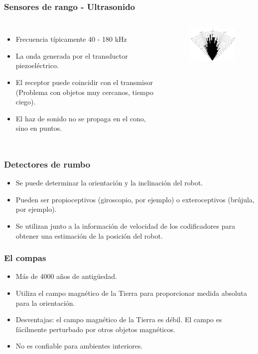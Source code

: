\documentclass{beamer}
\begin{document}
\begin{frame}
\frametitle{Sensores de rango - Ultrasonido}
\begin{columns}[c]
\begin{itemize}
\item Frecuencia típicamente 40 - 180 kHz
\item La onda generada por el transductor piezoeléctrico.
\item El receptor puede coincidir con el transmisor (Problema con objetos muy cercanos, tiempo ciego).
\item El haz de sonido no se propaga en el cono, sino en puntos.
\end{itemize}
\begin{figure}[!h]
\centering
\includegraphics[width=2in]{ultrasonido}
\end{figure}
\end{columns}
\end{frame}

\begin{frame}
\frametitle{Detectores de rumbo}
\begin{itemize}
\item Se puede determinar la orientación y la inclinación del robot.
\item Pueden ser propioceptivos (giroscopio, por ejemplo) o exteroceptivos (brújula, por ejemplo).
\item Se utilizan junto a la información de velocidad de los codificadores para obtener una estimación de la posición del robot.
\end{itemize}
\end{frame}

\begin{frame}
\frametitle{El compas}
\begin{itemize}
\item Más de 4000 años de antigüedad.
\item Utiliza el campo magnético de la Tierra para proporcionar medida absoluta para la orientación.
\item Desventajas: el campo magnético de la Tierra es débil. El campo es fácilmente perturbado por otros  objetos magnéticos.
\item No es confiable para ambientes interiores.
\end{itemize}
\end{frame}
\end{document}
